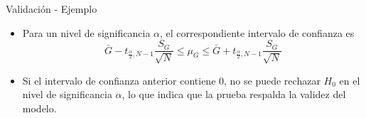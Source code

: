 \begin{frame}{Validación - Ejemplo}
    \begin{itemize}
        \item Para un nivel de significancia $\alpha$, el correspondiente intervalo de confianza es
        \begin{equation*}
            \bar{G}-t_{\frac{\alpha}{2},N-1}\frac{S_G}{\sqrt{N}}\leq \mu_G \leq \bar{G}+t_{\frac{\alpha}{2},N-1}\frac{S_G}{\sqrt{N}}
        \end{equation*}
        \item Si el intervalo de confianza anterior contiene 0, no se puede rechazar $H_0$ en el nivel de significancia $\alpha$, lo que indica que la prueba respalda la validez del modelo.
    \end{itemize}
\end{frame}